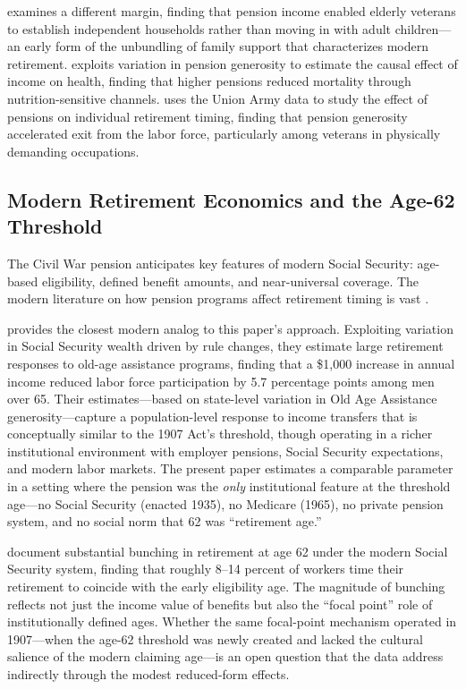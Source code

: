 \documentclass[12pt]{article}
\begin{document}
\citet{costa1997displacing} examines a different margin, finding that pension income enabled elderly veterans to establish independent households rather than moving in with adult children---an early form of the unbundling of family support that characterizes modern retirement. \citet{eli2015income} exploits variation in pension generosity to estimate the causal effect of income on health, finding that higher pensions reduced mortality through nutrition-sensitive channels. \citet{vitek2022effect} uses the Union Army data to study the effect of pensions on individual retirement timing, finding that pension generosity accelerated exit from the labor force, particularly among veterans in physically demanding occupations.

\subsection{Modern Retirement Economics and the Age-62 Threshold}

The Civil War pension anticipates key features of modern Social Security: age-based eligibility, defined benefit amounts, and near-universal coverage. The modern literature on how pension programs affect retirement timing is vast \citep[see][for a review]{dalen2010old, moffitt2002welfare}.

\citet{fetter2018} provides the closest modern analog to this paper's approach. Exploiting variation in Social Security wealth driven by rule changes, they estimate large retirement responses to old-age assistance programs, finding that a \$1,000 increase in annual income reduced labor force participation by 5.7 percentage points among men over 65. Their estimates---based on state-level variation in Old Age Assistance generosity---capture a population-level response to income transfers that is conceptually similar to the 1907 Act's threshold, though operating in a richer institutional environment with employer pensions, Social Security expectations, and modern labor markets. The present paper estimates a comparable parameter in a setting where the pension was the \textit{only} institutional feature at the threshold age---no Social Security (enacted 1935), no Medicare (1965), no private pension system, and no social norm that 62 was ``retirement age.''

\citet{behaghel2012} document substantial bunching in retirement at age 62 under the modern Social Security system, finding that roughly 8--14 percent of workers time their retirement to coincide with the early eligibility age. The magnitude of bunching reflects not just the income value of benefits but also the ``focal point'' role of institutionally defined ages. Whether the same focal-point mechanism operated in 1907---when the age-62 threshold was newly created and lacked the cultural salience of the modern claiming age---is an open question that the data address indirectly through the modest reduced-form effects.
\end{document}
